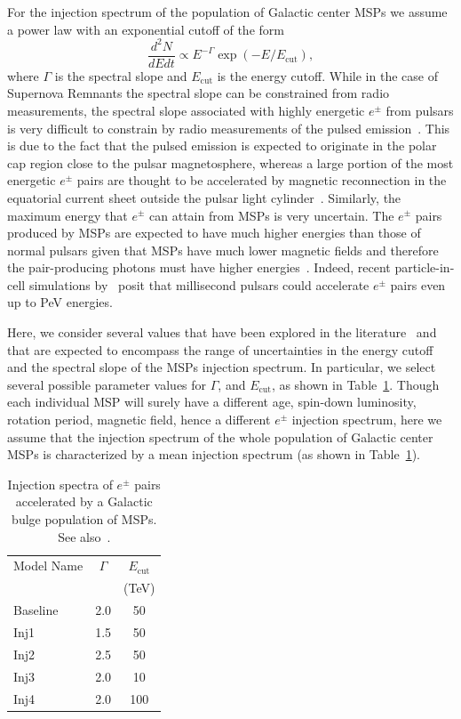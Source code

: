 \documentclass[doublespace,nopageskip]{VTthesis} %
\begin{document}
For the injection spectrum of the population of Galactic center MSPs we 
assume a power law with an exponential cutoff of the form 
\begin{equation}
  \label{eq:mspspectrum}
  \dfrac{d^2N}{dEdt} \propto E^{-\Gamma}\exp(-E/E_{\text{cut}}),
\end{equation}
where $\Gamma$ is the spectral slope and $E_{\text{cut}}$ is the energy cutoff. While in the case of Supernova Remnants the spectral slope can be constrained from radio measurements, the spectral slope associated with highly energetic $e^\pm$ from pulsars is very difficult to constrain by radio measurements of the pulsed emission~\citep{2010A&A...524A..51D}. This is due to the fact that the pulsed emission is expected to originate in the polar cap region close to the pulsar magnetosphere, whereas a large portion of the most energetic $e^\pm$ pairs are thought to be accelerated by magnetic reconnection in the equatorial current sheet outside the pulsar light cylinder~\citep{2016MNRAS.457.2401C}. Similarly, the maximum energy that $e^{\pm}$ can attain from MSPs is very uncertain. The $e^\pm$ pairs produced by MSPs are expected to have much higher energies than those of normal pulsars given that MSPs have much lower magnetic fields and therefore the pair-producing photons must have higher energies~\citep{2021arXiv210105751H}. Indeed, recent particle-in-cell simulations by~\citep{2020A&A...635A.138G} posit that millisecond pulsars could accelerate $e^\pm$ pairs even up to PeV energies.

Here, we consider several values that have been explored in the literature~\citep[e.g.,][]{2015ApJ...802..124Y,2019PhRvD..99l3020S,2020A&A...635A.138G} and that are expected to encompass the range of uncertainties in the energy cutoff and the spectral slope of the MSPs injection spectrum. In particular, we select several possible parameter values for $\Gamma$, and $E_{\text{cut}}$, as shown in Table~\ref{tab:mspspectrum}. Though each individual MSP will surely have a different age, spin-down luminosity, rotation period, magnetic field, hence a different $e^\pm$ injection spectrum, here we assume that the injection spectrum of the whole population of Galactic center MSPs is characterized by a mean injection spectrum (as shown in Table~\ref{tab:mspspectrum}).

\begin{table}[htb]
    \centering
    \caption{Injection spectra of $e^{\pm}$ pairs accelerated by a Galactic bulge population of MSPs. See also~\citep{2019PhRvD..99l3020S}.}
    \begin{tabular}{lcc}
    \toprule
    Model Name&$\Gamma$ & $E_{\text{cut}}$\\
    & &  (TeV) \\
    \midrule
    Baseline &2.0 & 50 \\
    Inj1&1.5 & 50 \\
    Inj2&2.5 & 50 \\
    Inj3&2.0 & 10 \\
    Inj4&2.0 & 100\\
    \bottomrule
    \end{tabular}
    \label{tab:mspspectrum}
\end{table}
\end{document}
